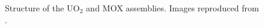 \documentclass[letterpaper]{article}
\begin{document}
\begin{figure}[htbp!]
    \centering
    \caption{Structure of the UO$_2$ and MOX assemblies. Images reproduced from \cite{capilla_applications_2009}.}
    \label{res:2d-bench-config2}
\end{figure}
\end{document}
